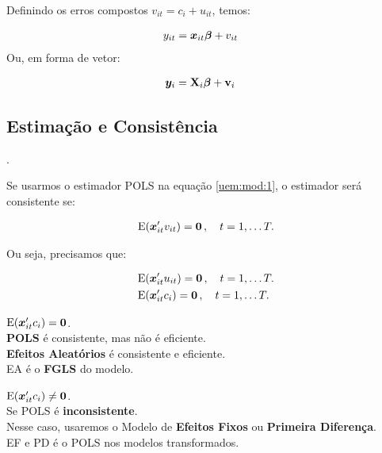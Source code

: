\documentclass[11pt, oneside, a4paper, article]{article}
\numberwithin{equation}{section}
\begin{document}
\vspace{1 em}
\noindent
Definindo os erros compostos $v_{it} = c_{i} + u_{it}$, temos:

\vspace{-1 em}
\begin{align}\label{uem:mod:2}
	y_{it} &= \boldsymbol{x}_{it} \boldsymbol{\beta} + v_{it}
\end{align}
Ou, em forma de vetor:

\vspace{-1 em}
\begin{align}\label{uem:mod:vec}
	\boldsymbol{y}_{i} &= \mathbf{X}_{i} \boldsymbol{\beta} + \mathbf{v}_{i}
\end{align}

\subsection{Estimação e Consistência}
\noindent
\citet[Sec.10.3 -- Estimating UEM by POLS, p.256]{wool-2010}.

\vspace{1 em}
Se usarmos o estimador POLS na equação \eqref{uem:mod:1}, o estimador será consistente se:

\vspace{-1 em}
\begin{align*}
	\text{E}(\boldsymbol{x}_{it}' v_{it}) = \boldsymbol{0} \, , \quad t=1, \dots T.
\end{align*}

Ou seja, precisamos que:

\vspace{-1 em}
\begin{align*}
& 
\text{E}(\boldsymbol{x}_{it}' u_{it}) = \boldsymbol{0} \, , \quad t=1, \dots T.
\\
&
\text{E}(\boldsymbol{x}_{it}' c_{i}) = \boldsymbol{0} \, , \quad t=1, \dots T.
\end{align*}

\begin{description}[]
	\item [Caso 1:] $\text{E}(\boldsymbol{x}_{it}' c_{i}) = \boldsymbol{0}$. \\
\textbf{POLS} é consistente, mas não é eficiente.\\
\textbf{Efeitos Aleatórios} é consistente e eficiente.\\
EA é o \textbf{FGLS}  do modelo.

\item [Caso 2:] $\text{E}(\boldsymbol{x}_{it}' c_{i}) \neq \boldsymbol{0}$. \\
Se POLS é \textbf{inconsistente}. \\
Nesse caso, usaremos o Modelo de \textbf{Efeitos Fixos} ou \textbf{Primeira Diferença}. \\
EF e PD é o POLS nos modelos transformados.
\end{description}
\end{document}
